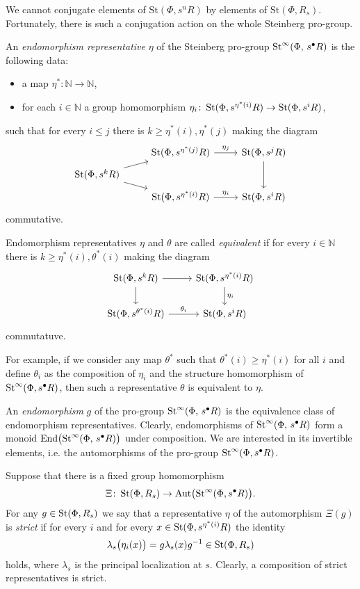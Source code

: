 \documentclass[oneside, 11pt]{amsart} \pdfoutput=1
\begin{document}
We cannot conjugate elements of $\mathrm{St}(\Phi, s^nR)$ by elements of $\mathrm{St}(\Phi, R_s)$. Fortunately, there is such a conjugation action on the whole Steinberg pro-group.

\begin{df}
An {\it endomorphism representative} $\eta$ of the Steinberg pro-group $\mathop{\mathrm{St}}\nolimits^\infty(\Phi,\,s^\bullet R)$ is the following data: 
\begin{itemize}
\item
a map $\eta^* \colon \mathbb N \to \mathbb N$,
\item
for each $i \in \mathbb N$ a group homomorphism $\eta_i \colon \mathop{\mathrm{St}}\nolimits(\Phi, s^{\eta^*(i)} R) \to \mathop{\mathrm{St}}\nolimits(\Phi, s^i R)$,
\end{itemize}
such that for every $i \leq j$ there is $k \geq \eta^*(i), \eta^*(j)$ making the diagram
$$\begin{tikzcd}[row sep=tiny]
& \St(\Phi, s^{\eta^*(j)} R)\ar{r}{\eta_j} & \St(\Phi, s^j R) \ar{dd}\\
\St(\Phi, s^k R) \ar{ur} \ar{dr} & &\\
&\St(\Phi, s^{\eta^*(i)} R) \ar{r}{\eta_i} & \St(\Phi, s^i R)
\end{tikzcd}$$
commutative.

Endomorphism representatives $\eta$ and $\theta$ are called {\it equivalent} if for every $i \in \mathbb N$ there is $k \geq \eta^*(i), \theta^*(i)$ making the diagram
$$\begin{tikzcd}
\St(\Phi, s^k R) \ar{r} \ar{d} & \St(\Phi, s^{\eta^*(i)} R) \ar{d}{\eta_i}\\
\St(\Phi, s^{\theta^*(i)} R) \ar{r}{\theta_i} & \St(\Phi, s^i R)
\end{tikzcd}$$
commutatuve.

For example, if we consider any map $\theta^*$ such that $\theta^*(i) \geq \eta^*(i)$ for all $i$ and define $\theta_i$ as the composition of $\eta_i$ and the structure homomorphism of $\mathop{\mathrm{St}}\nolimits^\infty(\Phi, s^\bullet R)$, then such a representative $\theta$ is equivalent to $\eta$.

An {\it endomorphism} $g$ of the pro-group $\mathop{\mathrm{St}}\nolimits^\infty(\Phi,\,s^\bullet R)$ is the equivalence class of endomorphism representatives. Clearly, endomorphisms of $\mathop{\mathrm{St}}\nolimits^\infty(\Phi,\,s^\bullet R)$ form a monoid $\mathrm{End}\bigl(\mathop{\mathrm{St}}\nolimits^\infty(\Phi,\,s^\bullet R)\bigr)$ under composition. We are interested in its invertible elements, i.e. the automorphisms of the pro-group \(\mathop{\mathrm{St}}\nolimits^\infty(\Phi, s^\bullet R)\).

Suppose that there is a fixed group homomorphism $$\Xi \colon \mathop{\mathrm{St}}\nolimits(\Phi, R_s) \to \mathrm{Aut}\bigl(\mathop{\mathrm{St}}\nolimits^\infty(\Phi, s^\bullet R)\bigr).$$ For any $g \in \mathop{\mathrm{St}}\nolimits(\Phi, R_s)$ we say that a representative $\eta$ of the automorphism $\Xi(g)$ is {\it strict} if for every $i$ and for every $x \in \mathop{\mathrm{St}}\nolimits(\Phi, s^{\eta^*(i)} R)$ the identity
$$
\lambda_s\bigl(\eta_i(x)\bigr) = g \lambda_s(x) g^{-1} \in \mathop{\mathrm{St}}\nolimits(\Phi, R_s)
$$
holds, where $\lambda_s$ is the principal localization at $s$. Clearly, a composition of strict representatives is strict.
\end{df}
\end{document}
